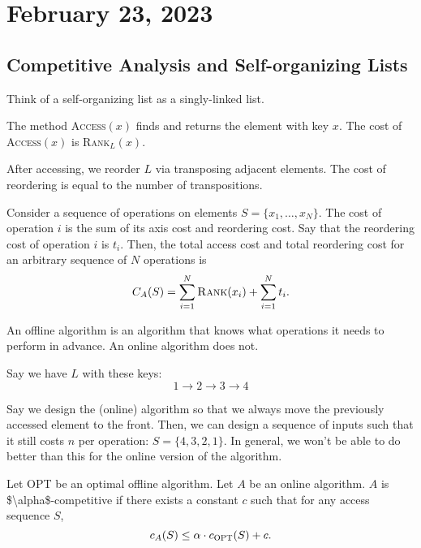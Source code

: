 \section{February 23, 2023}

\subsection{Competitive Analysis and Self-organizing Lists}

Think of a self-organizing list as a singly-linked list. 

The method \textsc{Access}$(x)$ finds and returns the element with key $x$. The cost of \textsc{Access}$(x)$ is \textsc{Rank}$_L(x)$. 

After accessing, we reorder $L$ via transposing adjacent elements. The cost of reordering is equal to the number of transpositions.

Consider a sequence of operations on elements $S=\{x_1, \hdots, x_N\}$. The cost of operation $i$ is the sum of its axis cost and reordering cost. Say that the reordering cost of operation $i$ is $t_i$. Then, the total access cost and total reordering cost for an arbitrary sequence of $N$ operations is
\[C_A(S) = \sum_{i=1}^N \textsc{Rank}(x_i) + \sum_{i=1}^Nt_i.\]

\begin{definition}

An \ac{offline algorithm} is an algorithm that knows what operations it needs to perform in advance. An \ac{online algorithm} does not. 
\end{definition}

Say we have $L$ with these keys:
\[1\longrightarrow 2\longrightarrow 3\longrightarrow 4\]

Say we design the (online) algorithm so that we always move the previously accessed element to the front. Then, we can design a sequence of inputs such that it still costs $n$ per operation: $S=\{4,3,2,1\}$. In general, we won't be able to do better than this for the online version of the algorithm. 

\begin{definition}

Let \textsc{OPT} be an optimal offline algorithm. Let $A$ be an online algorithm. $A$ is \ac{$\alpha$-competitive} if there exists a constant $c$ such that for any access sequence $S$, 
\[c_A(S)\leq \alpha\cdot c_{\textsc{OPT}}(S) + c.\]
\end{definition}

